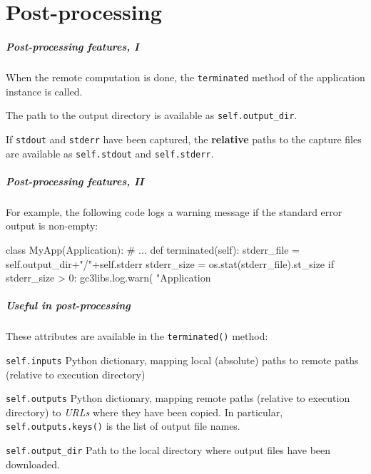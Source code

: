 \documentclass[english,serif,mathserif,xcolor=pdftex,dvipsnames,table]{beamer}
\begin{document}
\part{Post-processing}

\begin{frame}[fragile]
  \frametitle{Post-processing features, I}

  When the remote computation is done, the \texttt{terminated} method
  of the application instance is called.

  \+
  The path to the output directory is available as
  \lstinline|self.output_dir|.

  \+
  If \texttt{stdout} and \texttt{stderr}
  have been captured, the \textbf{relative} paths to the capture files
  are available as \lstinline|self.stdout| and
  \lstinline|self.stderr|.
\end{frame}


\begin{frame}[fragile]
  \frametitle{Post-processing features, II}

  For example, the following code logs a warning message if the
  standard error output is non-empty:
\begin{python}
class MyApp(Application):
  # ...
  def terminated(self):
    stderr_file = self.output_dir+"/"+self.stderr
    stderr_size = os.stat(stderr_file).st_size
    if stderr_size > 0:
      gc3libs.log.warn(
        "Application %
\end{python}
\end{frame}


\begin{frame}[fragile]
  \frametitle{Useful in post-processing}\small

  These attributes are available in the \texttt{terminated()} method:

  \+
  \begin{describe}{\lstinline|self.inputs|}
    Python dictionary, mapping local (absolute) paths to remote paths (relative
    to execution directory)
  \end{describe}

  \+
  \begin{describe}{\lstinline|self.outputs|}
    Python dictionary, mapping remote paths (relative to execution directory) to
    \emph{URLs} where they have been copied. In particular,
    \lstinline|self.outputs.keys()| is the list of output file names.
  \end{describe}

  \+
  \begin{describe}{\lstinline|self.output_dir|}
    Path to the local directory where output files have been downloaded.
  \end{describe}
\end{frame}
\end{document}
